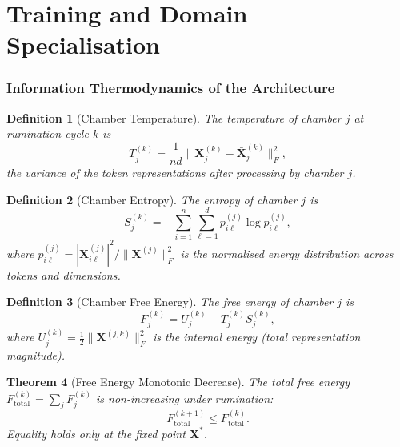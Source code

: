 \documentclass[twocolumn,10pt]{article}
\newtheorem{theorem}{Theorem}[section]
\newtheorem{definition}[theorem]{Definition}
\theoremstyle{remark}
\begin{document}
\part{Training and Domain Specialisation}

\section{Information Thermodynamics of the Architecture}
\label{sec:thermodynamics}

\begin{definition}[Chamber Temperature]
\label{def:chamber_temp}
The \emph{temperature} of chamber $j$ at rumination cycle $k$ is
\begin{equation}
    T_j^{(k)} = \frac{1}{nd} \|\mathbf{X}_j^{(k)} - \bar{\mathbf{X}}_j^{(k)}\|_F^2,
    \label{eq:chamber_temp}
\end{equation}
the variance of the token representations after processing by chamber $j$.
\end{definition}

\begin{definition}[Chamber Entropy]
\label{def:chamber_entropy}
The \emph{entropy} of chamber $j$ is
\begin{equation}
    S_j^{(k)} = -\sum_{i=1}^n \sum_{\ell=1}^d p_{i\ell}^{(j)} \log p_{i\ell}^{(j)},
    \label{eq:chamber_entropy}
\end{equation}
where $p_{i\ell}^{(j)} = |\mathbf{X}_{i\ell}^{(j)}|^2 / \|\mathbf{X}^{(j)}\|_F^2$ is the normalised energy distribution across tokens and dimensions.
\end{definition}

\begin{definition}[Chamber Free Energy]
\label{def:free_energy}
The \emph{free energy} of chamber $j$ is
\begin{equation}
    F_j^{(k)} = U_j^{(k)} - T_j^{(k)} S_j^{(k)},
    \label{eq:chamber_free_energy}
\end{equation}
where $U_j^{(k)} = \frac{1}{2}\|\mathbf{X}^{(j,k)}\|_F^2$ is the internal energy (total representation magnitude).
\end{definition}

\begin{theorem}[Free Energy Monotonic Decrease]
\label{thm:free_energy_decrease}
The total free energy $F_{\text{total}}^{(k)} = \sum_j F_j^{(k)}$ is non-increasing under rumination:
\begin{equation}
    F_{\text{total}}^{(k+1)} \leq F_{\text{total}}^{(k)}.
    \label{eq:monotone}
\end{equation}
Equality holds only at the fixed point $\mathbf{X}^*$.
\end{theorem}
\end{document}
